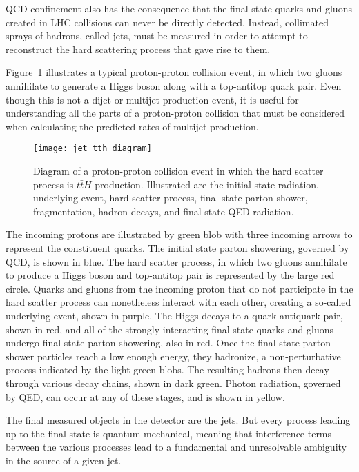 QCD confinement also has the consequence that the final state quarks and gluons created in LHC collisions
can never be directly detected.
Instead, collimated sprays of hadrons, called jets, must be measured in order to attempt to reconstruct the
hard scattering process that gave rise to them.

Figure~\ref{fig:jet_tth_diagram} illustrates a typical proton-proton collision event,
in which two gluons annihilate to generate a Higgs boson along with a top-antitop quark pair.
Even though this is not a dijet or multijet production event,
it is useful for understanding all the parts of a proton-proton collision that must be considered when calculating the
predicted rates of multijet production.

\begin{figure}[!ht]
    \centering
\texttt{[image: jet\_tth\_diagram]}
\caption{Diagram of a proton-proton collision event in which the hard scatter process is $t\bar{t}H$ production.
Illustrated are the initial state radiation, underlying event, hard-scatter process, final state parton shower,
fragmentation, hadron decays, and final state QED radiation.}
\label{fig:jet_tth_diagram}
\end{figure}\cite{sherpa-2004}

The incoming protons are illustrated by green blob with three incoming arrows to represent the constituent quarks.
The initial state parton showering, governed by QCD, is shown in blue.
The hard scatter process, in which two gluons annihilate to produce a Higgs boson and top-antitop pair is represented
by the large red circle.
Quarks and gluons from the incoming proton that do not participate in the hard scatter process can nonetheless interact
with each other, creating a so-called underlying event, shown in purple.
The Higgs decays to a quark-antiquark pair, shown in red, and all of the strongly-interacting final state quarks
and gluons undergo final state parton showering, also in red.
Once the final state parton shower particles reach a low enough energy, they hadronize, a non-perturbative process
indicated by the light green blobs.
The resulting hadrons then decay through various decay chains, shown in dark green.
Photon radiation, governed by QED, can occur at any of these stages, and is shown in yellow.

The final measured objects in the detector are the jets.
But every process leading up to the final state is quantum mechanical,
meaning that interference terms between the various processes lead to a fundamental and unresolvable ambiguity in the source of a given jet.

